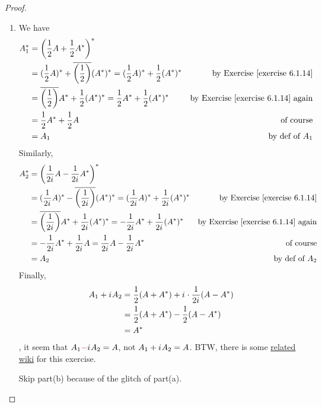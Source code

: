 \begin{proof} \ 

\begin{enumerate}
\item
We have
\begin{align*}
    A_1^* & = \left( \frac{1}{2} A + \frac{1}{2} A^* \right)^* \\
        & = (\frac{1}{2} A)^* + \conjugatet{\left(\frac{1}{2}\right)} (A^*)^* = (\frac{1}{2} A)^* + \frac{1}{2} (A^*)^* & \text{by \EXEC{6.1.14}} \\
        & = \conjugatet{\left(\frac{1}{2}\right)} A^* + \frac{1}{2} (A^*)^* = \frac{1}{2} A^* + \frac{1}{2} (A^*)^* & \text{by \EXEC{6.1.14} again} \\
        & = \frac{1}{2} A^* + \frac{1}{2} A & \text{of course} \\
        & = A_1 & \text{by def of \(A_1\)}
\end{align*}
Similarly,
\begin{align*}
    A_2^* & = \left( \frac{1}{2\iu} A - \frac{1}{2\iu} A^* \right)^* \\
        & = (\frac{1}{2\iu} A)^* - \conjugatet{\left(\frac{1}{2\iu}\right)} (A^*)^* = (\frac{1}{2\iu} A)^* + \frac{1}{2\iu} (A^*)^* & \text{by \EXEC{6.1.14}} \\
        & = \conjugatet{\left(\frac{1}{2\iu}\right)} A^* + \frac{1}{2\iu} (A^*)^* = -\frac{1}{2\iu} A^* + \frac{1}{2\iu} (A^*)^* & \text{by \EXEC{6.1.14} again} \\
        & = -\frac{1}{2\iu} A^* + \frac{1}{2\iu} A = \frac{1}{2\iu} A - \frac{1}{2\iu} A^* & \text{of course} \\
        & = A_2 & \text{by def of \(A_2\)}
\end{align*}
Finally,
\begin{align*}
    A_1 + {i\mkern1mu} A_2 & = \frac{1}{2} (A + A^*) + {i\mkern1mu} \cdot \frac{1}{2{i\mkern1mu}}(A - A^*) \\
        & = \frac{1}{2} (A + A^*) - \frac{1}{2}(A - A^*) \\
        & = A^*
\end{align*}
, it seem that \(A_1 \RED{-} \iu A_2 = A\), not \(A_1 + {i\mkern1mu} A_2 = A\).
BTW, there is some \href{https://www.wikiwand.com/en/Hermitian_matrix#/Decomposition_into_Hermitian_and_skew-Hermitian_matrices}{related wiki} for this exercise.

Skip part(b) because of the glitch of part(a).
\end{enumerate}
\end{proof}


